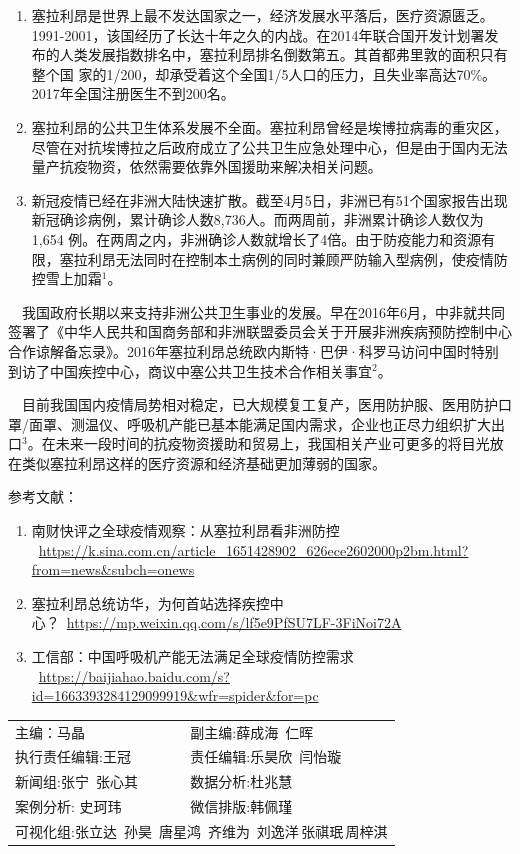 \documentclass[
]{article}
\providecommand{\tightlist}{%
  \setlength{\itemsep}{0pt}\setlength{\parskip}{0pt}}
\begin{document}
\begin{enumerate}
\def\labelenumi{\arabic{enumi}.}
\tightlist
\item
  塞拉利昂是世界上最不发达国家之一，经济发展水平落后，医疗资源匮乏。
  1991-2001，该国经历了长达十年之久的内战。在2014年联合国开发计划署发布的人类发展指数排名中，塞拉利昂排名倒数第五。其首都弗里敦的面积只有整个国
  家的1/200，却承受着这个全国1/5人口的压力，且失业率高达70\%。2017年全国注册医生不到200名。
\item
  塞拉利昂的公共卫生体系发展不全面。塞拉利昂曾经是埃博拉病毒的重灾区，尽管在对抗埃博拉之后政府成立了公共卫生应急处理中心，但是由于国内无法量产抗疫物资，依然需要依靠外国援助来解决相关问题。
\item
  新冠疫情已经在非洲大陆快速扩散。截至4月5日，非洲已有51个国家报告出现新冠确诊病例，累计确诊人数8,736人。而两周前，非洲累计确诊人数仅为1,654
  例。在两周之内，非洲确诊人数就增长了4倍。由于防疫能力和资源有限，塞拉利昂无法同时在控制本土病例的同时兼顾严防输入型病例，使疫情防控雪上加霜\(^1\)。
\end{enumerate}

\(\quad\)我国政府长期以来支持非洲公共卫生事业的发展。早在2016年6月，中非就共同签署了《中华人民共和国商务部和非洲联盟委员会关于开展非洲疾病预防控制中心合作谅解备忘录》。2016年塞拉利昂总统欧内斯特·巴伊·科罗马访问中国时特别到访了中国疾控中心，商议中塞公共卫生技术合作相关事宜\(^2\)。

\(\quad\)目前我国国内疫情局势相对稳定，已大规模复工复产，医用防护服、医用防护口罩/面罩、测温仪、呼吸机产能已基本能满足国内需求，企业也正尽力组织扩大出口\(^3\)。在未来一段时间的抗疫物资援助和贸易上，我国相关产业可更多的将目光放在类似塞拉利昂这样的医疗资源和经济基础更加薄弱的国家。

\Large 参考文献：

\begin{enumerate}
\def\labelenumi{\arabic{enumi}.}
\item
  南财快评之全球疫情观察：从塞拉利昂看非洲防控
  ~\url{https://k.sina.com.cn/article_1651428902_626ece2602000p2bm.html?from=news\&subch=onews}
\item
  塞拉利昂总统访华，为何首站选择疾控中心？~\url{https://mp.weixin.qq.com/s/lf5e9PfSU7LF-3FiNoi72A}
\item
  工信部：中国呼吸机产能无法满足全球疫情防控需求
  ~\url{https://baijiahao.baidu.com/s?id=1663393284129099919\&wfr=spider\&for=pc}
\end{enumerate}

\centering
\fontsize{12}{12}
\selectfont
\begin{tabular}{ll}

主编：马晶  &  副主编:薛成海\,  仁晖  \\
执行责任编辑:王冠  & 责任编辑:乐昊欣\, 闫怡璇 \\
新闻组:张宁\, 张心其  & 数据分析:杜兆慧 \\
案例分析: 史珂玮  &  微信排版:韩佩瑾 \\
\multicolumn{2}{l}{可视化组:张立达\, 孙昊\, 唐星鸿\, 齐维为\, 刘逸洋\,张祺珉\,周梓淇}

\end{tabular}
\end{document}
